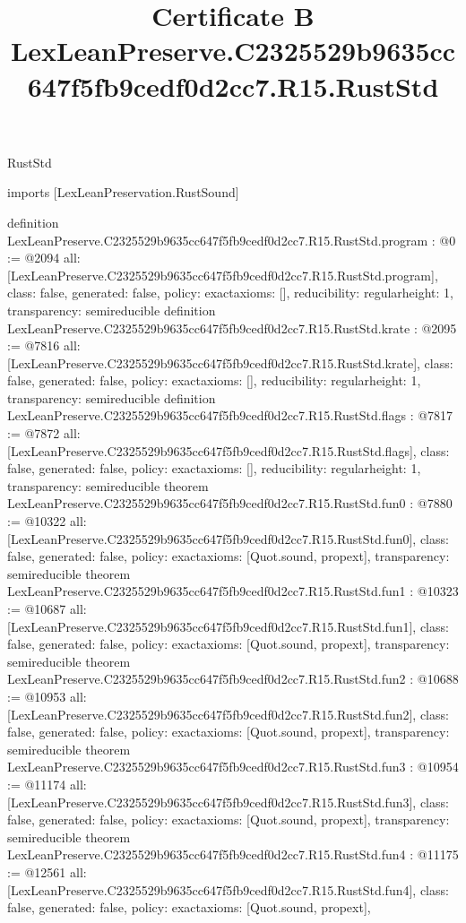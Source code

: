 \begin{lexlean}{RustStd}
\title{Certificate B LexLeanPreserve.C2325529b9635cc647f5fb9cedf0d2cc7.R15.RustStd}
\begin{coremodule}
imports [LexLeanPreservation.RustSound]

definition LexLeanPreserve.C2325529b9635cc647f5fb9cedf0d2cc7.R15.RustStd.program : @0 := @2094 {
  all: [LexLeanPreserve.C2325529b9635cc647f5fb9cedf0d2cc7.R15.RustStd.program],
  class: false,
  generated: false,
  policy: exact{axioms: []},
  reducibility: regular{height: 1},
  transparency: semireducible
}
definition LexLeanPreserve.C2325529b9635cc647f5fb9cedf0d2cc7.R15.RustStd.krate : @2095 := @7816 {
  all: [LexLeanPreserve.C2325529b9635cc647f5fb9cedf0d2cc7.R15.RustStd.krate],
  class: false,
  generated: false,
  policy: exact{axioms: []},
  reducibility: regular{height: 1},
  transparency: semireducible
}
definition LexLeanPreserve.C2325529b9635cc647f5fb9cedf0d2cc7.R15.RustStd.flags : @7817 := @7872 {
  all: [LexLeanPreserve.C2325529b9635cc647f5fb9cedf0d2cc7.R15.RustStd.flags],
  class: false,
  generated: false,
  policy: exact{axioms: []},
  reducibility: regular{height: 1},
  transparency: semireducible
}
theorem LexLeanPreserve.C2325529b9635cc647f5fb9cedf0d2cc7.R15.RustStd.fun0 : @7880 := @10322 {
  all: [LexLeanPreserve.C2325529b9635cc647f5fb9cedf0d2cc7.R15.RustStd.fun0],
  class: false,
  generated: false,
  policy: exact{axioms: [Quot.sound, propext]},
  transparency: semireducible
}
theorem LexLeanPreserve.C2325529b9635cc647f5fb9cedf0d2cc7.R15.RustStd.fun1 : @10323 := @10687 {
  all: [LexLeanPreserve.C2325529b9635cc647f5fb9cedf0d2cc7.R15.RustStd.fun1],
  class: false,
  generated: false,
  policy: exact{axioms: [Quot.sound, propext]},
  transparency: semireducible
}
theorem LexLeanPreserve.C2325529b9635cc647f5fb9cedf0d2cc7.R15.RustStd.fun2 : @10688 := @10953 {
  all: [LexLeanPreserve.C2325529b9635cc647f5fb9cedf0d2cc7.R15.RustStd.fun2],
  class: false,
  generated: false,
  policy: exact{axioms: [Quot.sound, propext]},
  transparency: semireducible
}
theorem LexLeanPreserve.C2325529b9635cc647f5fb9cedf0d2cc7.R15.RustStd.fun3 : @10954 := @11174 {
  all: [LexLeanPreserve.C2325529b9635cc647f5fb9cedf0d2cc7.R15.RustStd.fun3],
  class: false,
  generated: false,
  policy: exact{axioms: [Quot.sound, propext]},
  transparency: semireducible
}
theorem LexLeanPreserve.C2325529b9635cc647f5fb9cedf0d2cc7.R15.RustStd.fun4 : @11175 := @12561 {
  all: [LexLeanPreserve.C2325529b9635cc647f5fb9cedf0d2cc7.R15.RustStd.fun4],
  class: false,
  generated: false,
  policy: exact{axioms: [Quot.sound, propext]},
}
\end{coremodule}
\end{lexlean}
